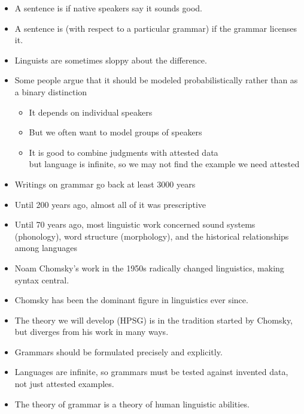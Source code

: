 \documentclass[a4paper,landscape,headrule,footrule]{foils}
\begin{document}

\begin{itemize}
\item A sentence is  if native speakers
say it sounds good.

\item A sentence is  (with respect to
a particular grammar) if the grammar
licenses it.

\item Linguists are sometimes sloppy about the
difference.

\item Some people argue that it should be modeled probabilistically
  rather than as a binary distinction
  \begin{itemize}
  \item It depends on individual speakers
  \item But we often want to model groups of speakers
  \item It is good to combine judgments with attested data
    \\ but language is infinite, so we may not find the example we need attested
  \end{itemize}
\end{itemize}

\begin{itemize}
\item Writings on grammar go back at least 3000 years
\item Until 200 years ago, almost all of it was prescriptive
\item Until 70 years ago, most linguistic work concerned sound systems (phonology),
word structure (morphology), and the historical relationships among
languages
\end{itemize}

\begin{itemize}
\item Noam Chomsky’s work in the 1950s
radically changed linguistics, making
syntax central.
\item Chomsky has been the dominant figure
in linguistics ever since.
\item The theory we will develop (HPSG) is in the
tradition started by Chomsky, but
diverges from his work in many ways.
\end{itemize}

\begin{itemize}
\item Grammars should be formulated precisely
and explicitly.
\item Languages are infinite, so grammars must be
tested against invented data, not just attested
examples.
\item The theory of grammar is a theory of human
linguistic abilities.
\end{itemize}
\end{document}
